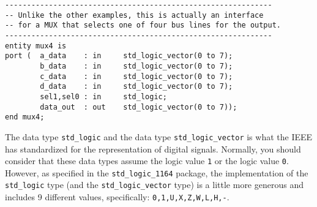 \noindent
\begin{minipage}{0.99\linewidth}
\vspace{5pt}
\centering
{}
\begin{lstlisting}[label=entity_3, caption=Entity declaration with bundles.]
-------------------------------------------------------------
-- Unlike the other examples, this is actually an interface
-- for a MUX that selects one of four bus lines for the output.
-------------------------------------------------------------
entity mux4 is
port (  a_data    : in     std_logic_vector(0 to 7);
        b_data    : in     std_logic_vector(0 to 7);
        c_data    : in     std_logic_vector(0 to 7);
        d_data    : in     std_logic_vector(0 to 7);
        sel1,sel0 : in     std_logic;
        data_out  : out    std_logic_vector(0 to 7));
end mux4;
\end{lstlisting}
\end{minipage}

The data type \texttt{std\_logic} and the data type \texttt{std\_logic\_vector} is what the IEEE has standardized for the representation of digital signals. Normally, you should consider that these data types assume the logic value \texttt{1} or the logic value \texttt{0}. However, as specified in the \texttt{std\_logic\_1164} package, the implementation of the \texttt{std\_logic} type (and the \texttt{std\_logic\_vector} type) is a little more generous and includes 9 different values, specifically: \texttt{0,1,U,X,Z,W,L,H,-}.

